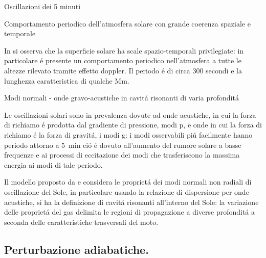 \begin{frame}{Oscillazioni dei 5 minuti}

\begin{block}{Comportamento periodico dell'atmosfera solare con grande coerenza spaziale e temporale}

In \citet{lei62velocity} si osserva che la superficie solare ha scale spazio-temporali privilegiate: in particolare \'e presente un comportamento periodico nell'atmosfera a tutte le altezze rilevato tramite effetto doppler. Il periodo \'e di circa 300 secondi e la lunghezza caratteristica di qualche \si{\mega\meter}.

\end{block}

\begin{block}{Modi normali - onde gravo-acustiche in cavit\'a risonanti di varia profondit\'a}

Le oscillazioni solari sono in prevalenza dovute ad onde acustiche, in cui la forza di richiamo \'e prodotta dal gradiente di pressione, modi p, e onde in cui la forza di richiamo \'e la forza di gravit\'a, i modi g: i modi osservabili pi\'u facilmente hanno periodo attorno a \SI{5}{\minute} ci\'o \'e dovuto all'aumento del rumore solare a basse frequenze e ai processi di eccitazione dei modi che trasferiscono la massima energia ai modi di tale periodo.

Il modello proposto da \citet{ulrich70five} e \citet*{stein71five} considera le propriet\'a dei modi normali non radiali di oscillazione del Sole, in particolare usando la relazione di dispersione per onde acustiche, si ha la definizione di cavit\'a risonanti all'interno del Sole: la variazione delle propriet\'a del gas delimita le regioni di propagazione a diverse profondit\'a a seconda delle caratteristiche trasversali del moto.

\end{block}

\end{frame}

\subsection{Perturbazione adiabatiche.}

